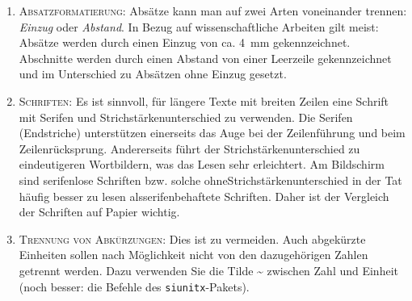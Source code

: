 \begin{enumerate}
   \item \textsc{Absatzformatierung}: Absätze kann man auf zwei Arten
            voneinander trennen: \emph{Einzug} oder \emph{Abstand}. In Bezug auf wissenschaftliche Arbeiten gilt meist: Absätze werden durch einen Einzug von ca. \SI{4}{mm} gekennzeichnet. 
            Abschnitte werden durch einen Abstand von einer Leerzeile gekennzeichnet und im Unterschied zu Absätzen ohne Einzug gesetzt.
%
%
   \item \textsc{Schriften}: Es ist sinnvoll, für längere Texte mit breiten 
            Zeilen eine Schrift mit Serifen und Strichstärkenunterschied zu verwenden.
            Die Serifen (Endstriche) unterstützen einerseits das Auge bei der Zeilenführung und beim Zeilenrücksprung.
            Andererseits führt der Strichstärkenunterschied zu eindeutigeren Wortbildern, was das Lesen sehr erleichtert.
            Am Bildschirm sind serifenlose Schriften bzw. solche ohneStrichstärkenunterschied in der Tat häufig besser zu lesen alsserifenbehaftete Schriften. 
            Daher ist der Vergleich der Schriften auf Papier wichtig.
   \item \textsc{Trennung von Abkürzungen}: Dies ist zu vermeiden. 
            Auch abgekürzte Einheiten sollen nach Möglichkeit nicht von den dazugehörigen Zahlen getrennt werden. 
            Dazu verwenden Sie die Tilde \~{} zwischen Zahl und Einheit (noch besser: die Befehle des \texttt{siunitx}-Pakets).
\end{enumerate}


